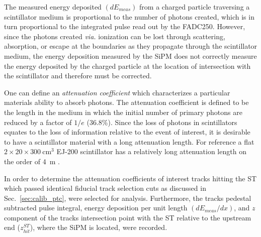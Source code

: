 
The measured energy deposited $(dE_{meas})$ from a charged particle traversing a scintillator medium is proportional to the number of photons created, which is in turn proportional to the integrated pulse read out by the FADC250. However, since the photons created \textit{via.} ionization can be lost through scattering, absorption, or escape at the boundaries as they propagate through the scintillator medium, the energy deposition measured by the SiPM does not correctly measure the energy deposited by the charged particle at the location of intersection with the scintillator and therefore must be corrected.


One can define an \textit{attenuation coefficient} which characterizes a particular materials ability to absorb photons. The attenuation coefficient is defined to be the length in the medium in which the initial number of primary photons are reduced by a factor of $1/e$ (36.8\%).  Since the loss of photons in scintillators equates to the loss of information relative to the event of interest, it is desirable to have a scintillator material with a long attenuation length.  For reference a flat $2 \times 20 \times 300\ \mathrm{cm^{3}}$ EJ-200 scintillator has a relatively long attenuation length on the order of 4~m \cite{ej200_specs}.

In order to determine the attenuation coefficients of interest tracks hitting the ST which passed identical fiducial track selection cuts as discussed in Sec.~\ref{sec:calib_ptc}, were selected for analysis.  Furthermore, the tracks pedestal subtracted pulse integral, energy deposition per unit length $(dE_{meas} / dx)$, and $z$ component of the tracks intersection point with the ST relative to the upstream end ($z^{ST}_{hit}$), where the SiPM is located, were recorded.  

